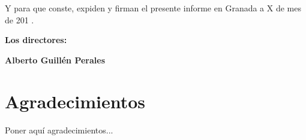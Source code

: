 \vspace{0.5cm}

Y para que conste, expiden y firman el presente informe en Granada a X de mes de 201 .

\vspace{1cm}

\textbf{Los directores:}

\vspace{5cm}

\noindent \textbf{Alberto Guillén Perales}

\chapter*{Agradecimientos}
\thispagestyle{empty}

       \vspace{1cm}


Poner aquí agradecimientos...

